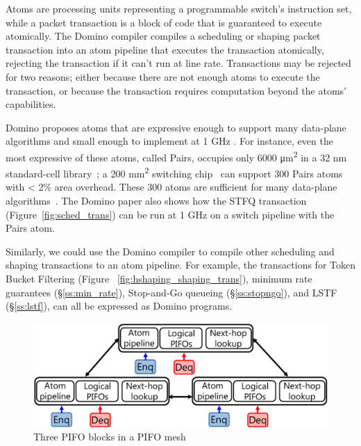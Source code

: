 Atoms are processing units representing a programmable switch's instruction
set, while a packet transaction is a block of code that is guaranteed to
execute atomically.  The Domino compiler compiles a scheduling or shaping packet
transaction into an atom pipeline that executes the transaction
atomically, rejecting the transaction if it can't run at line rate.
Transactions may be rejected for two reasons; either because there are
not enough atoms to execute the transaction, or because the
transaction requires computation beyond the atoms' capabilities.
 
Domino proposes atoms that are expressive enough to support many
data-plane algorithms and small enough to implement at 1 GHz . For
instance, even the most expressive of these atoms, called Pairs,
occupies only 6000 \si{\micro\metre\squared} in a 32 nm standard-cell
library~\cite{domino_sigcomm}; a 200 \si{\milli\metre\squared}
switching chip~\cite{glen_parsing} can support 300 Pairs atoms with
< 2\% area overhead. These 300 atoms are sufficient for
many data-plane algorithms~\cite{domino_sigcomm}. The Domino paper
also shows how the STFQ transaction (Figure~\ref{fig:sched_trans}) can
be run at 1 GHz on a switch pipeline with the Pairs atom.

Similarly, we could use the Domino compiler to compile other
scheduling and shaping transactions to an atom pipeline.  For example,
the transactions for Token Bucket Filtering (Figure
~\ref{fig:hshaping_shaping_trans}), minimum rate guarantees
(\S\ref{ss:min_rate}), Stop-and-Go queueing
(\S\ref{ss:stopngo}), and LSTF (\S\ref{ss:lstf}), can all
be expressed as Domino programs.  

\begin{figure}[!t]
  \centering
  \includegraphics[width=0.6\columnwidth]{pifo_pifo_mesh.pdf}
  \caption{Three PIFO blocks in a PIFO mesh}
  \label{fig:mesh}
\end{figure}

